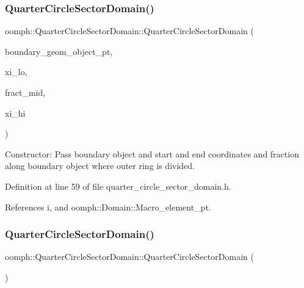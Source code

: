 \subsubsection{\texorpdfstring{Quarter\+Circle\+Sector\+Domain()}{QuarterCircleSectorDomain()}\hspace{0.1cm}{\footnotesize\ttfamily [1/2]}}
{\footnotesize\ttfamily oomph\+::\+Quarter\+Circle\+Sector\+Domain\+::\+Quarter\+Circle\+Sector\+Domain (\begin{DoxyParamCaption}\item[{\hyperlink{classoomph_1_1GeomObject}{Geom\+Object} $\ast$}]{boundary\+\_\+geom\+\_\+object\+\_\+pt,  }\item[{const double \&}]{xi\+\_\+lo,  }\item[{const double \&}]{fract\+\_\+mid,  }\item[{const double \&}]{xi\+\_\+hi }\end{DoxyParamCaption})\hspace{0.3cm}{\ttfamily [inline]}}



Constructor\+: Pass boundary object and start and end coordinates and fraction along boundary object where outer ring is divided. 



Definition at line 59 of file quarter\+\_\+circle\+\_\+sector\+\_\+domain.\+h.



References i, and oomph\+::\+Domain\+::\+Macro\+\_\+element\+\_\+pt.

\mbox{\label{classoomph_1_1QuarterCircleSectorDomain_a08d26f31016ef7b40e6bdadfc1eee29a}} 
\subsubsection{\texorpdfstring{Quarter\+Circle\+Sector\+Domain()}{QuarterCircleSectorDomain()}\hspace{0.1cm}{\footnotesize\ttfamily [2/2]}}
{\footnotesize\ttfamily oomph\+::\+Quarter\+Circle\+Sector\+Domain\+::\+Quarter\+Circle\+Sector\+Domain (\begin{DoxyParamCaption}\item[{const \hyperlink{classoomph_1_1QuarterCircleSectorDomain}{Quarter\+Circle\+Sector\+Domain} \&}]{ }\end{DoxyParamCaption})\hspace{0.3cm}{\ttfamily [inline]}}



